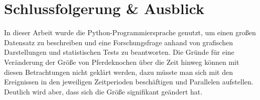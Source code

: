 \section{Schlussfolgerung \& Ausblick}
In dieser Arbeit wurde die Python-Programmiersprache genutzt, um einen großen Datensatz zu beschreiben und eine Forschungsfrage anhand von grafischen Darstellungen und statistischen Tests zu beantworten.
Die Gründe für eine Veränderung der Größe von Pferdeknochen über die Zeit hinweg können mit diesen Betrachtungen nicht geklärt werden, dazu müsste man sich mit den Ereignissen in den jeweiligen Zeitperioden beschäftigen und Parallelen aufstellen. 
Deutlich wird aber, dass sich die Größe signifikant geändert hat.